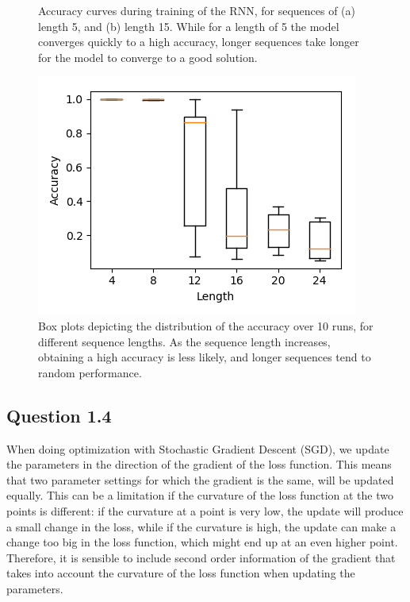 \documentclass{article}
\begin{document}
\begin{figure}[t]
\begin{subfigure}{0.49\textwidth}
\caption{}
\end{subfigure}
 \caption{Accuracy curves during training of the RNN, for sequences of (a) length 5, and (b) length 15. While for a length of 5 the model converges quickly to a high accuracy, longer sequences take longer for the model to converge to a good solution.}
\label{fig:rnn_acc_curves}
\end{figure}

\begin{figure}[t]
\centering
\includegraphics[scale=0.7]{img/rnn-acc-Lbox}
 \caption{Box plots depicting the distribution of the accuracy over 10 runs, for different sequence lengths. As the sequence length increases, obtaining a high accuracy is less likely, and longer sequences tend to random performance.}
\label{fig:rnn_acc_box}
\end{figure}

\subsection*{Question 1.4}

When doing optimization with Stochastic Gradient Descent (SGD), we update the parameters in the direction of the gradient of the loss function. This means that two parameter settings for which the gradient is the same, will be updated equally. This can be a limitation if the curvature of the loss function at the two points is different: if the curvature at a point is very low, the update will produce a small change in the loss, while if the curvature is high, the update can make a change too big in the loss function, which might end up at an even higher point. Therefore, it is sensible to include second order information of the gradient that takes into account the curvature of the loss function when updating the parameters.
\end{document}
